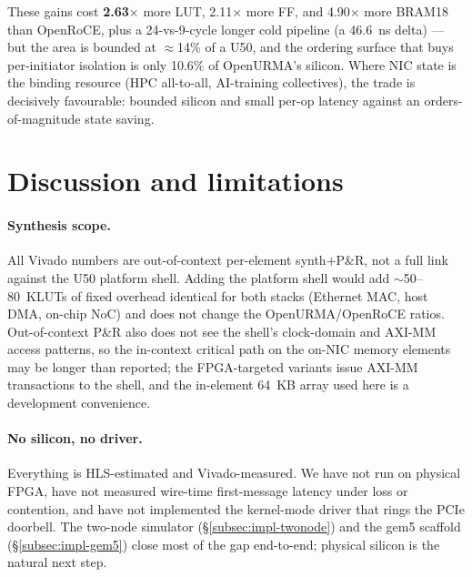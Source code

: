 \documentclass[10pt,twocolumn]{article}
\begin{document}
These gains cost \textbf{2.63$\times$} more LUT, 2.11$\times$ more
FF, and 4.90$\times$ more BRAM18 than OpenRoCE, plus a 24-vs-9-cycle
longer cold pipeline (a 46.6~ns delta) --- but the area is bounded
at $\approx$14\% of a U50, and the ordering surface that buys
per-initiator isolation is only 10.6\% of OpenURMA's silicon. Where
NIC state is the binding resource (HPC all-to-all, AI-training
collectives), the trade is decisively favourable: bounded silicon
and small per-op latency against an orders-of-magnitude state
saving.

\section{Discussion and limitations}
\label{sec:discussion}

\paragraph{Synthesis scope.}
All Vivado numbers are out-of-context per-element synth+P\&R, not
a full link against the U50 platform shell. Adding the platform
shell would add $\sim$50--80~KLUTs of fixed overhead identical for
both stacks (Ethernet MAC, host DMA, on-chip NoC) and does not
change the OpenURMA/OpenRoCE ratios. Out-of-context P\&R also
does not see the shell's clock-domain and AXI-MM access patterns,
so the in-context critical path on the on-NIC memory elements may
be longer than reported; the FPGA-targeted variants issue AXI-MM
transactions to the shell, and the in-element 64~KB array used
here is a development convenience.

\paragraph{No silicon, no driver.}
Everything is HLS-estimated and Vivado-measured. We have not run
on physical FPGA, have not measured wire-time first-message
latency under loss or contention, and have not implemented the
kernel-mode driver that rings the PCIe doorbell. The two-node
simulator (\S\ref{subsec:impl-twonode}) and the gem5 scaffold
(\S\ref{subsec:impl-gem5}) close most of the gap end-to-end;
physical silicon is the natural next step.
\end{document}
